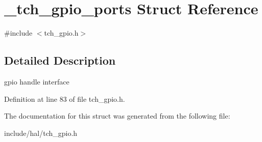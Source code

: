 \hypertarget{struct__tch__gpio__ports}{\section{\+\_\+tch\+\_\+gpio\+\_\+ports Struct Reference}
\label{struct__tch__gpio__ports}
}


{\ttfamily \#include $<$tch\+\_\+gpio.\+h$>$}



\subsection{Detailed Description}
gpio handle interface 

Definition at line 83 of file tch\+\_\+gpio.\+h.



The documentation for this struct was generated from the following file\+:\begin{DoxyCompactItemize}
\item 
include/hal/tch\+\_\+gpio.\+h\end{DoxyCompactItemize}
